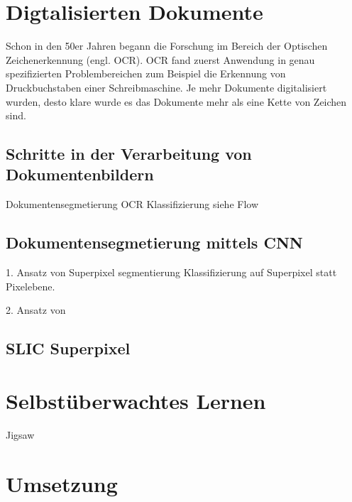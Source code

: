\chapter{Digtalisierten Dokumente}



% 
Schon in den 50er Jahren begann die Forschung im Bereich der Optischen Zeichenerkennung (engl. OCR)\autocite{BairdEvolutionDocumentImage2014}. OCR fand zuerst Anwendung in genau spezifizierten Problembereichen zum Beispiel die Erkennung von Druckbuchstaben einer Schreibmaschine. 
Je mehr Dokumente digitalisiert wurden, desto klare wurde es das Dokumente mehr als 
eine Kette von Zeichen sind. 

\section{Schritte in der Verarbeitung von Dokumentenbildern}
Dokumentensegmetierung
OCR
Klassifizierung siehe \cite{McConnaugheyLabeledSegmentationPrinted2017}
Flow
\section{Dokumentensegmetierung mittels CNN}
1. Ansatz von \autocite{ChenConvolutionalNeuralNetworks2017}
Superpixel segmentierung
Klassifizierung auf Superpixel statt Pixelebene.

2. Ansatz von \autocite{WickFullyConvolutionalNeural2017}

\section{SLIC Superpixel}
\cite{AchantaSLICSuperpixels2010}

\chapter{Selbstüberwachtes Lernen}

Jigsaw
\cite{NorooziUnsupervisedLearningVisual2016}

\chapter{Umsetzung}

